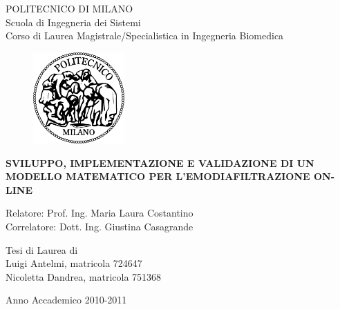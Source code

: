 \thispagestyle{empty}
\vspace*{-0.5cm} \bfseries{
\begin{center}
  \large
  POLITECNICO DI MILANO\\
  \normalsize
  \vspace*{1.0cm}
  Scuola di Ingegneria dei Sistemi\\
  Corso di Laurea Magistrale/Specialistica in Ingegneria Biomedica\\
  \vspace*{1.0cm}
  \begin{figure}[htbp]
    \begin{center}
      \includegraphics[width=3.5cm]{./immagini/logopm.eps}
    \end{center}
  \end{figure}
  \vspace*{1.0cm} \LARGE



  \textbf{SVILUPPO, IMPLEMENTAZIONE E VALIDAZIONE DI UN MODELLO MATEMATICO PER L'EMODIAFILTRAZIONE ON-LINE}\\


\end{center}
\vspace*{4.0cm} \large
\begin{flushleft}


  Relatore: Prof. Ing. Maria Laura Costantino\\
  Correlatore: Dott. Ing. Giustina Casagrande

\end{flushleft}
\vspace*{1.5cm}
\begin{flushright}


  Tesi di Laurea di\\ Luigi Antelmi, matricola 724647 \\ 
		       Nicoletta Dandrea, matricola 751368 \\


\end{flushright}
\vspace*{1.0cm}
\begin{center}
  Anno Accademico 2010-2011
\end{center} \clearpage
}


